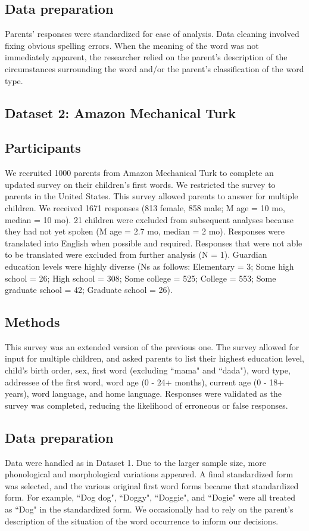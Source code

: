 \documentclass[10pt,letterpaper]{article}
\begin{document}
\subsection{Data preparation}
Parents' responses were standardized for ease of analysis. Data cleaning involved fixing obvious spelling errors. When the meaning of the word was not immediately apparent, the researcher relied on the parent's description of the circumstances surrounding the word and/or the parent's classification of the word type.

\subsection{Dataset 2: Amazon Mechanical Turk}

\subsection{Participants}
We recruited 1000 parents from Amazon Mechanical Turk to complete an updated survey on their children's first words. We restricted the survey to parents in the United States. This survey allowed parents to answer for multiple children. We received 1671 responses (813 female, 858 male; M age = 10 mo, median = 10 mo). 21 children were excluded from subsequent analyses because they had not yet spoken (M age = 2.7 mo, median = 2 mo). Responses were translated into English when possible and required. Responses that were not able to be translated were excluded from further analysis (N = 1). Guardian education levels were highly diverse (Ns as follows: Elementary = 3; Some high school = 26; High school = 308; Some college = 525; College = 553; Some graduate school = 42; Graduate school = 26). 

\subsection{Methods}
This survey was an extended version of the previous one. The survey allowed for input for multiple children, and asked parents to list their highest education level, child's birth order, sex, first word (excluding ``mama" and ``dada"), word type, addressee of the first word, word age (0 - 24+ months), current age (0 - 18+ years), word language, and home language. Responses were validated as the survey was completed, reducing the likelihood of erroneous or false responses. 

\subsection{Data preparation}
Data were handled as in Dataset 1. Due to the larger sample size, more phonological and morphological variations appeared. A final standardized form was selected, and the various original first word forms became that standardized form. For example, ``Dog dog", ``Doggy", ``Doggie", and ``Dogie" were all treated as ``Dog" in the standardized form. We occasionally had to rely on the parent's description of the situation of the word occurrence to inform our decisions.
\end{document}
